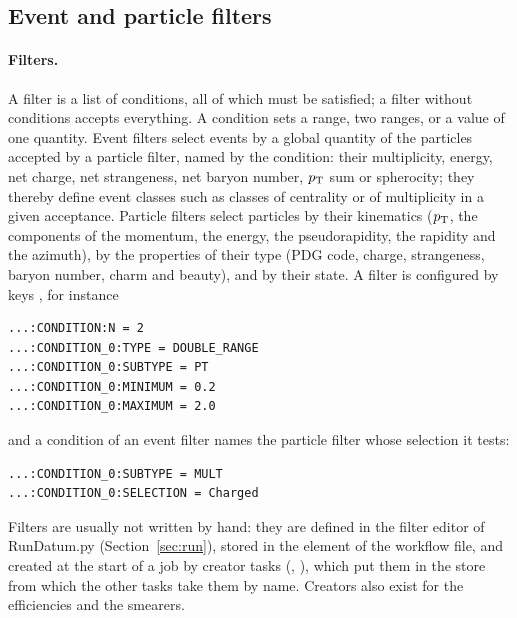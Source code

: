 \subsection{Event and particle filters}
\label{sec:filters}

\paragraph{Filters.}
A filter is a list of conditions, all of which must be satisfied; a filter without conditions accepts everything. A
condition sets a range, two ranges, or a value of one quantity. Event filters select events by a global quantity of the particles accepted by a particle filter, named by the condition: their multiplicity, energy, net charge, net strangeness, net baryon number, $p_{\mathrm{T}}$ sum or spherocity; they thereby define event classes such as classes of centrality or of multiplicity in a given acceptance. Particle filters select particles by their kinematics ($p_{\mathrm{T}}$, the components of the momentum, the energy, the pseudorapidity, the rapidity and the azimuth), by the properties of their type (PDG code, charge, strangeness, baryon number, charm and beauty), and by their state. A filter is configured by keys , for instance
{\footnotesize
\begin{verbatim}
...:CONDITION:N = 2
...:CONDITION_0:TYPE = DOUBLE_RANGE
...:CONDITION_0:SUBTYPE = PT
...:CONDITION_0:MINIMUM = 0.2
...:CONDITION_0:MAXIMUM = 2.0
\end{verbatim}}
\noindent and a condition of an event filter names the particle filter whose selection it tests:
{\footnotesize
\begin{verbatim}
...:CONDITION_0:SUBTYPE = MULT
...:CONDITION_0:SELECTION = Charged
\end{verbatim}}
\noindent Filters are usually not written by hand: they are defined in the filter editor of RunDatum.py (Section~\ref{sec:run}),
stored in the  element of the workflow file, and created at the start of a job by creator tasks
(, ), which put them in the store from which the other tasks take
them by name. Creators also exist for the efficiencies and the smearers.

